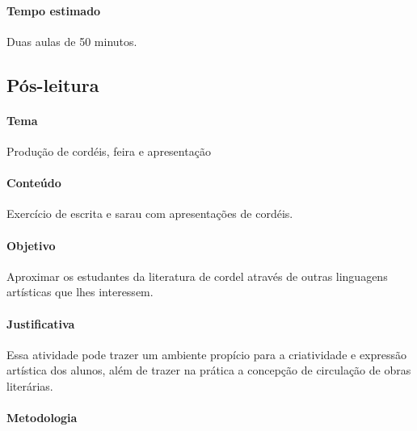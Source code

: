 \documentclass[12pt]{extarticle}
\begin{document}
\paragraph{Tempo estimado} Duas aulas de 50 minutos.

\subsection{Pós-leitura}


\paragraph{Tema} Produção de cordéis, feira e apresentação

\paragraph{Conteúdo} Exercício de escrita e sarau com apresentações de cordéis.

\paragraph{Objetivo} Aproximar os estudantes da literatura de cordel através de
outras linguagens artísticas que lhes interessem.

\paragraph{Justificativa} Essa atividade pode trazer um ambiente propício para
a criatividade e expressão artística dos alunos, além de trazer na prática
a concepção de circulação de obras literárias.

\paragraph{Metodologia}
\end{document}
